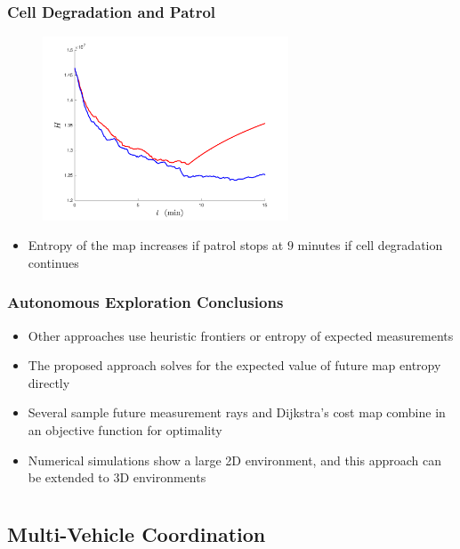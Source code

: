 \documentclass[11pt,professionalfonts,hyperref={pdftex,pdfpagemode=none,pdfstartview=FitH}]{beamer}
\begin{document}
\begin{frame}
\frametitle{Cell Degradation and Patrol}

\begin{figure}
	\centering
	\includegraphics[width=0.65\textwidth]{entropy_patrol_9minSwitch.pdf}
\end{figure}

\begin{itemize}
	\item Entropy of the map increases if patrol stops at $9$ minutes if cell degradation continues
\end{itemize}

\end{frame}


\begin{frame}
\frametitle{Autonomous Exploration Conclusions}

\begin{itemize}
	\item Other approaches use heuristic frontiers or entropy of expected measurements
	\item The proposed approach solves for the expected value of future map entropy directly
	\item Several sample future measurement rays and Dijkstra's cost map combine in an objective function for optimality
	\item Numerical simulations show a large 2D environment, and this approach can be extended to 3D environments
\end{itemize}

\end{frame}

\section*{}
\subsection*{Multi-Vehicle Coordination}
\end{document}

